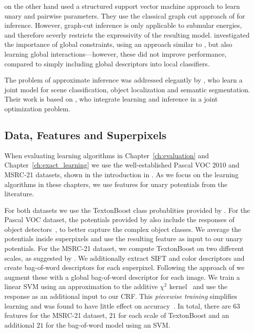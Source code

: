 \citet{szummer2008learning} on the other hand used a structured support vector
machine approach to learn unary and pairwise parameters. They use the classical
graph cut approach of \citet{boykov2001fast} for inference.  However, graph-cut
inference is only applicable to submular energies, and therefore severly
restricts the expressivity of the resulting model.
\citet{lucchi2011spatial} investigated the importance of global constraints,
using an approach similar to \citet{szummer2008learning}, but also learning
global interactions---however, these did not improve performance, compared to
simply including global descriptors into local classifiers.

The problem of approximate inference was addressed elegantly by
\citet{yao2012describing}, who learn a joint model for scene classification,
object localization and semantic segmentation.  Their work is based on
\citet{hazan2010primal}, who integrate learning and inference in a joint
optimization problem.

\subsection{Data, Features and Superpixels}
When evaluating learning algorithms in Chapter~\ref{ch:evaluation} and
Chapter~\ref{ch:exact_learning} we use the well-established Pascal VOC 2010 and
MSRC-21 datasets, shown in the introduction in .
As we focus on the learning algorithms in these chapters, we use features for
unary potentials from the literature.

For both datasets we use the TextonBoost class probablities provided by
\citet{krahenbuhl2012efficient}. For the Pascal VOC dataset, the potentials
provided by \citet{krahenbuhl2012efficient} also include the responses of
object detectors~\citet{}, to better capture the complex object classes.
We average the potentials inside superpixels and use the resulting feature
as input to our unary potentials.
For the MSRC-21 dataset, we compute TextonBoost on two different scales, as
suggested by \citet{mottaghianalyzing}. We additionally extract SIFT and color descriptors and create
bag-of-word descriptors for each superpixel. Following the approach of
\citet{lucchi2011spatial} we augment these with a global bag-of-word descriptor
for each image. We train a linear SVM using an approximation to the additive
$\chi^2$ kernel~\citet{vedaldi2010efficient} and use the response as an
additional input to our CRF\@. This \emph{piecewise training} simplifies
learning and was found to have little effect on
accuracy~\citet{nowozin2010parameter}. In total, there are $63$ features
for the MSRC-21 dataset, $21$ for each scale of TextonBoost and an additional
$21$ for the bag-of-word model using an SVM.

